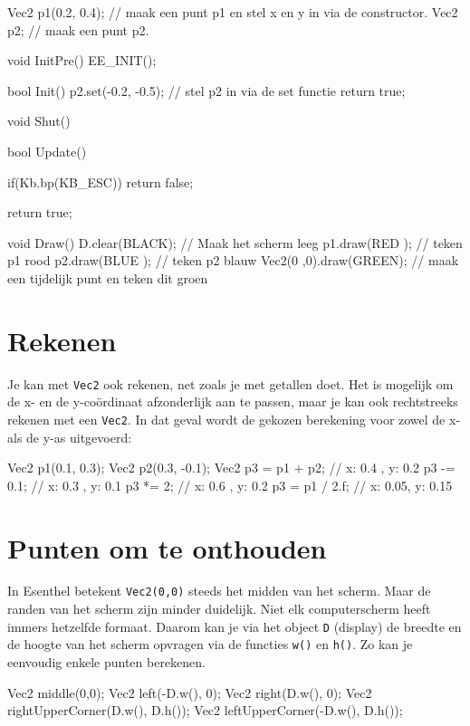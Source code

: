 \begin{code}
Vec2 p1(0.2, 0.4); // maak een punt p1 en stel x en y in via de constructor.
Vec2 p2;           // maak een punt p2.

void InitPre()
{
   EE_INIT();
}

bool Init()
{
   p2.set(-0.2, -0.5); // stel p2 in via de set functie
   return true;
}

void Shut() {}

bool Update()
{
   if(Kb.bp(KB_ESC)) return false;
   
   return true;
}

void Draw()
{
   D.clear(BLACK); // Maak het scherm leeg
   p1.draw(RED  ); // teken p1 rood  
   p2.draw(BLUE ); // teken p2 blauw
   Vec2(0 ,0).draw(GREEN); // maak een tijdelijk punt en teken dit groen
}

\end{code}

\section{Rekenen}
Je kan met \texttt{Vec2} ook rekenen, net zoals je met getallen doet. Het is mogelijk om de x- en de y-co\"ordinaat afzonderlijk aan te passen, maar je kan ook rechtstreeks rekenen met een \texttt{Vec2}. In dat geval wordt de gekozen berekening voor zowel de x- als de y-as uitgevoerd:

\begin{code}
Vec2 p1(0.1,  0.3);
Vec2 p2(0.3, -0.1);
Vec2 p3 = p1 + p2;  // x: 0.4 , y: 0.2
p3 -= 0.1;          // x: 0.3 , y: 0.1
p3 *= 2;            // x: 0.6 , y: 0.2
p3 = p1 / 2.f;      // x: 0.05, y: 0.15 
\end{code}

\section{Punten om te onthouden}
In Esenthel betekent \texttt{Vec2(0,0)} steeds het midden van het scherm. Maar de randen van het scherm zijn minder duidelijk. Niet elk computerscherm heeft immers hetzelfde formaat. Daarom kan je via het object \texttt{D} (display) de breedte en de hoogte van het scherm opvragen via de functies \texttt{w()} en \texttt{h()}. Zo kan je eenvoudig enkele punten berekenen.

\begin{code}
Vec2 middle(0,0);
Vec2 left(-D.w(), 0);
Vec2 right(D.w(), 0);
Vec2 rightUpperCorner(D.w(), D.h());
Vec2 leftUpperCorner(-D.w(), D.h());
\end{code}


